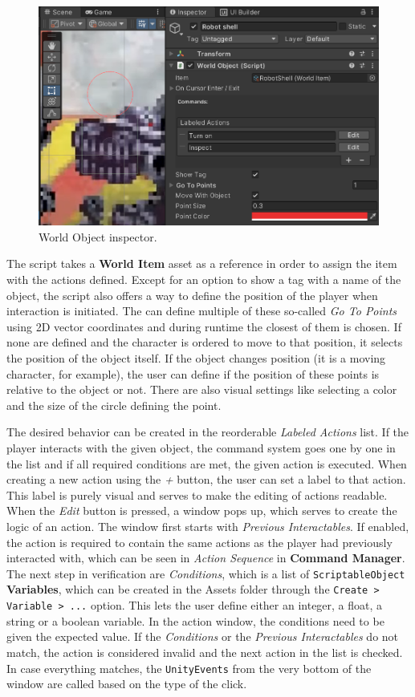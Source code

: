 \begin{figure}[H]
\centering
\includegraphics[width=.8\linewidth]{img/User doc/world_object.png}
\caption{World Object inspector.}
\label{fig:Manual-WO}
\end{figure}

The script takes a \textbf{World Item} asset as a reference in order to assign the item with the actions defined. Except for an option to show a tag with a name of the object, the script also offers a way to define the position of the player when interaction is initiated. The can define multiple of these so-called \textit{Go To Points} using 2D vector coordinates and during runtime the closest of them is chosen. If none are defined and the character is ordered to move to that position, it selects the position of the object itself. If the object changes position (it is a moving character, for example), the user can define if the position of these points is relative to the object or not. There are also visual settings like selecting a color and the size of the circle defining the point.

The desired behavior can be created in the reorderable \textit{Labeled Actions} list. If the player interacts with the given object, the command system goes one by one in the list and if all required conditions are met, the given action is executed. When creating a new action using the \textit{+} button, the user can set a label to that action. This label is purely visual and serves to make the editing of actions readable. When the \textit{Edit} button is pressed, a window pops up, which serves to create the logic of an action. The window first starts with \textit{Previous Interactables}. If enabled, the action is required to contain the same actions as the player had previously interacted with, which can be seen in \textit{Action Sequence} in \textbf{Command Manager}. The next step in verification are \textit{Conditions}, which is a list of \verb|ScriptableObject| \textbf{Variables}, which can be created in the Assets folder through the \verb|Create > Variable > ...| option. This lets the user define either an integer, a float, a string or a boolean variable. In the action window, the conditions need to be given the expected value. If the \textit{Conditions} or the \textit{Previous Interactables} do not match, the action is considered invalid and the next action in the list is checked. In case everything matches, the \verb|UnityEvents| from the very bottom of the window are called based on the type of the click.

